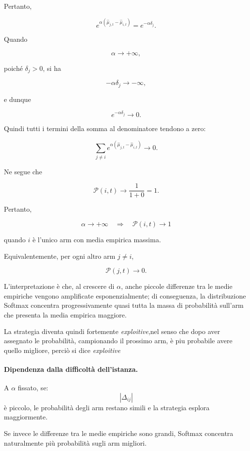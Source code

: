 \begin{observation}{}
Pertanto,

\[
e^{
\alpha
\left(
\widehat{\mu}_{j,t}
-
\widehat{\mu}_{i,t}
\right)
}
=
e^{-\alpha\delta_j}.
\]

Quando

\[
\alpha\to+\infty,
\]

poiché $\delta_j>0$, si ha

\[
-\alpha\delta_j\to-\infty,
\]

e dunque

\[
e^{-\alpha\delta_j}
\to 0.
\]

Quindi tutti i termini della somma al denominatore tendono a zero:

\[
\sum_{j\neq i}
e^{
\alpha
\left(
\widehat{\mu}_{j,t}
-
\widehat{\mu}_{i,t}
\right)
}
\to 0.
\]

Ne segue che

\[
\mathcal{P}(i,t)
\to
\frac{1}{1+0}
=
1.
\]

Pertanto,

\[
\boxed{
\alpha\to+\infty
\quad\Longrightarrow\quad
\mathcal{P}(i,t)\to1
}
\]

quando $i$ è l'unico arm con media empirica massima.

Equivalentemente, per ogni altro arm $j\neq i$,

\[
\mathcal{P}(j,t)\to0.
\]

L'interpretazione è che, al crescere di $\alpha$, anche piccole differenze tra le medie empiriche vengono amplificate esponenzialmente; di conseguenza, la distribuzione Softmax concentra progressivamente quasi tutta la massa di probabilità sull'arm che presenta la media empirica maggiore.
\end{observation}


La strategia diventa quindi fortemente \emph{exploitive},nel senso che dopo aver assegnato le probabilità, campionando il prossimo arm, è piu probabile avere quello migliore, perciò si dice \emph{exploitive}



\paragraph{Dipendenza dalla difficoltà dell'istanza.}
A $\alpha$ fissato, se:
\[
|\Delta_{ij}|
\]
è piccolo, le probabilità degli arm restano simili e la strategia esplora maggiormente.

Se invece le differenze tra le medie empiriche sono grandi, Softmax concentra naturalmente più probabilità sugli arm migliori.

